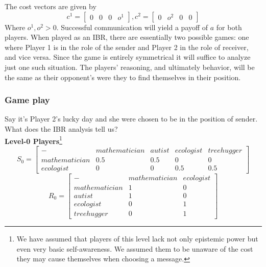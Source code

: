 \documentclass[10]{article}
\begin{document}
The cost vectors are given by 
\begin{equation*}
c^1=
\begin{bmatrix}
0 & 0 & 0 & o^1
\end{bmatrix}
,
c^2=
\begin{bmatrix}
0 & o^2 & 0 & 0
\end{bmatrix}
\end{equation*}
Where $o^1,o^2>0$. Successful communication will yield a payoff of $a$ for both players. When played as an IBR, there are essentially two possible games: one where Player 1 is in the role of the sender and Player 2 in the role of receiver, and vice versa. Since the game is entirely symmetrical it will suffice to analyze just one such situation. The players' reasoning, and ultimately behavior, will be the same as their opponent's were they to find themselves in their position.

\subsubsection{Game play}
Say it's Player 2's lucky day and she were chosen to be in the position of sender.  What does the IBR analysis tell us?\\
\textbf{Level-0 Players}\footnote{We have assumed that players of this level lack not only epistemic power but even very basic self-awareness. We assumed them to be unaware of the cost they may cause themselves when choosing a message.}\\
\begin{equation*}
S_0=
\begin{bmatrix}
- & mathematician & autist & ecologist & treehugger \\
mathematician  & 0.5      & 0.5    & 0        & 0   \\
ecologist  & 0     & 0   & 0.5      & 0.5 
\end{bmatrix}
\end{equation*}
\begin{equation*}
R_0=
\begin{bmatrix}
- & mathematician & ecologist\\
mathematician  & 1      & 0 \\
autist  & 1     & 0   \\
ecologist & 0 & 1 \\
treehugger & 0 & 1
\end{bmatrix}
\end{equation*}
\end{document}
